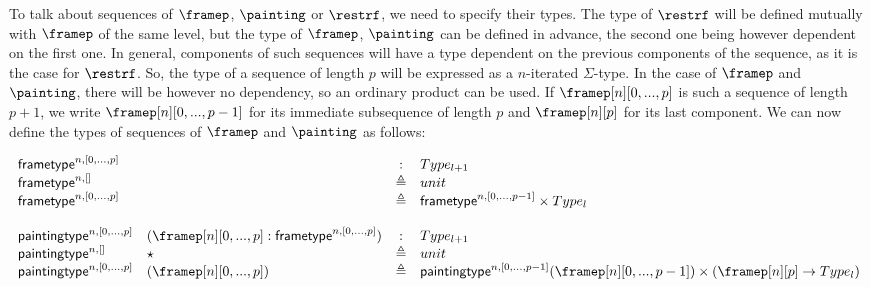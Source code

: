 \documentclass{msc}
\newcommand{\defeq}{\ensuremath{\triangleq}}
\newcommand{\frametype}{\ensuremath{\mathsf{frametype}}}
\newcommand{\paintingtype}{\ensuremath{\mathsf{paintingtype}}}
\begin{document}
\begin{itemize}
        To talk about sequences of $\framep$, $\painting$ or $\restrf$,
        we need to specify their types. The type of $\restrf$ will be
        defined mutually with $\framep$ of the same level, but the type of
        $\framep$, $\painting$ can be defined in advance, the second one
        being however dependent on the first one. In general, components of
        such sequences will have a type dependent on the previous components
        of the sequence, as it is the case for $\restrf$. So, the type of
        a sequence of length $p$ will be expressed as a $n$-iterated
        $\Sigma$-type. In the case of $\framep$ and $\painting$, there will
        be however no dependency, so an ordinary product can be used. If
        $\framep[n][0,...,p]$ is such a sequence of length $p+1$, we write
        $\framep[n][0,...,p-1]$ for its immediate subsequence of length $p$
        and $\framep[n][p]$ for its last component. We can now define the
        types of sequences of $\framep$ and $\painting$ as follows:

        $$
          \begin{array}{llcl}
            \frametype^{n,[0,...,p]}  &                                                     & :      & Type_{l+1}                                                               \\
            \frametype^{n,[]}         &                                                     & \defeq & unit                                                                     \\
            \frametype^{n,[0,...,p]}  &                                                     & \defeq & \frametype^{n,[0,...,p-1]} \times Type_l                               \\
            \\
            \paintingtype^{n,[0,...,p]} & (\framep[n][0,...,p]:\frametype^{n,[0,...,p]}) & :      & Type_{l+1}                                                               \\
            \paintingtype^{n,[]}        & \star                                               & \defeq & unit                                                                     \\
            \paintingtype^{n,[0,...,p]} & (\framep[n][0,...,p])                            & \defeq & \paintingtype^{n,[0,...,p-1]}(\framep[n][0,...,p-1]) \times (\framep[n][p] \rightarrow Type_l) \\
          \end{array}
        $$


\end{itemize}
\end{document}
